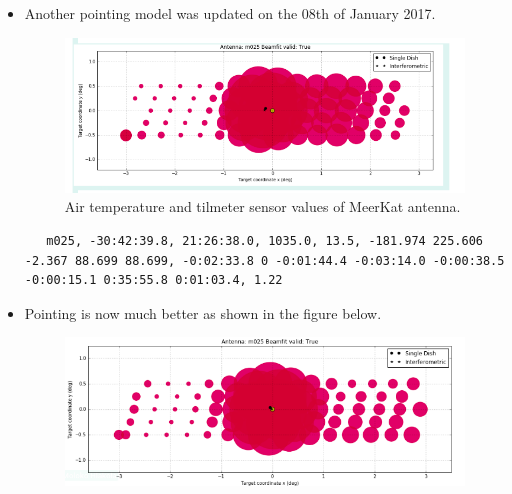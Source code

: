 \documentclass{article}
\begin{document}
{\begin{appendices}
\begin{itemize}
\begin{figure}[H]
	 	\caption{Air temperature and tilmeter sensor values of MeerKat antenna.}
	 	\label{fig:tilt1}
	 \end{figure}
	  
	  
	  
	  
	  
	  
	  
	  
	 \item  Another pointing model was updated on the 08th of January 2017.
	  \begin{figure}[H]
	  	\centering
	  	\includegraphics[scale=0.33]{m025_better_after.png}
	  	
	  	\caption{Air temperature and tilmeter sensor values of MeerKat antenna.}
	  	\label{fig:tilt5}
	  \end{figure}
  \begin{lstlisting}
   m025, -30:42:39.8, 21:26:38.0, 1035.0, 13.5, -181.974 225.606 -2.367 88.699 88.699, -0:02:33.8 0 -0:01:44.4 -0:03:14.0 -0:00:38.5 -0:00:15.1 0:35:55.8 0:01:03.4, 1.22
  \end{lstlisting}
	  
	  
	  \item Pointing is now much better as shown in the figure below. 
	  
	  \begin{figure}[H]
	  	\centering
	  	\includegraphics[scale=0.43]{m025AnotherPointing.png}
	  	

\end{figure}
\end{itemize}
\end{appendices}}
\end{document}
